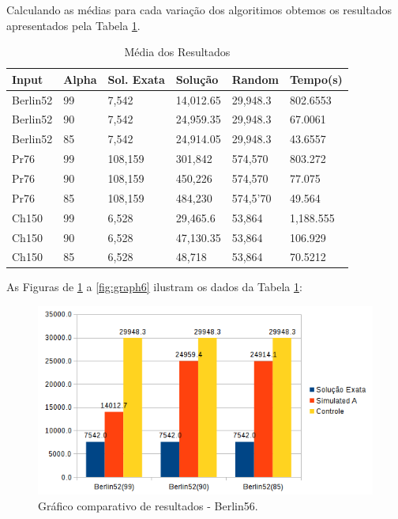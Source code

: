 \documentclass[a4paper, 12pt]{article}
\begin{document}
Calculando as médias para cada variação dos algoritimos obtemos os resultados apresentados pela Tabela \ref{tab:solMedia}.

\begin{table}[h]
\centering
\begin{tabular}{| l | l | l | l | l | l |}
\hline
\textbf{Input} & \textbf{Alpha} & \textbf{Sol. Exata} & \textbf{Solução} & \textbf{Random} & \textbf{Tempo(s)} \\\hline
Berlin52 & 99 & 7,542   & 14,012.65 & 29,948.3 & 802.6553  \\\hline
Berlin52 & 90 & 7,542   & 24,959.35 & 29,948.3 & 67.0061   \\\hline
Berlin52 & 85 & 7,542   & 24,914.05 & 29,948.3 & 43.6557   \\\hline
Pr76     & 99 & 108,159 & 301,842   & 574,570  & 803.272   \\\hline
Pr76     & 90 & 108,159 & 450,226   & 574,570  & 77.075    \\\hline
Pr76     & 85 & 108,159 & 484,230   & 574,5'70  & 49.564    \\\hline
Ch150    & 99 & 6,528   & 29,465.6  & 53,864   & 1,188.555 \\\hline
Ch150    & 90 & 6,528   & 47,130.35 & 53,864   & 106.929   \\\hline
Ch150    & 85 & 6,528   & 48,718    & 53,864   & 70.5212   \\\hline
\end{tabular}
\caption{\label{tab:solMedia} Média dos Resultados}
\end{table}

As Figuras de \ref{fig:graph1} a \ref{fig:graph6} ilustram os dados da Tabela \ref{tab:solMedia}:
\begin{figure}[H]
	\centering
	\includegraphics{figures/graph3.png}
	\caption{Gráfico comparativo de resultados - Berlin56.}
	\label{fig:graph1}
\end{figure}
\end{document}
